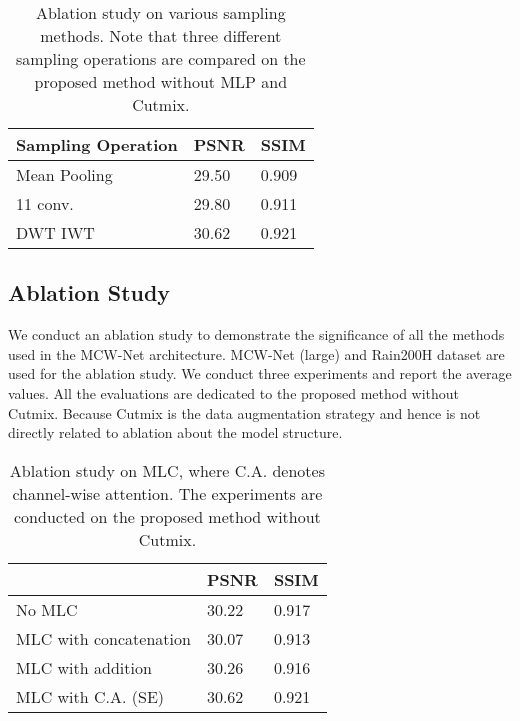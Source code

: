 \documentclass[a4paper,fleqn]{cas-dc}
\begin{document}
\begin{table}
	\caption{Ablation study on various sampling methods. Note that three different sampling operations are compared on the proposed method without MLP and Cutmix.}
	
	\begin{tabular*}{\tblwidth}{@{}LLL@{}}
		\toprule  
		Sampling Operation               & PSNR  & SSIM  \\ 
		\midrule
		Mean Pooling                     & 29.50 & 0.909 \\ 
		11 conv.                 & 29.80 & 0.911 \\
	    DWT  IWT                     & 30.62 & 0.921 \\ 
	    \bottomrule
	\end{tabular*} 
	\label{tab:sampling-ablation}
\end{table}


\subsection{Ablation Study}


We conduct an ablation study to demonstrate the significance of all the methods used in the MCW-Net architecture. MCW-Net (large) and Rain200H dataset are used for the ablation study. We conduct three experiments and report the average values. All the evaluations are dedicated to the proposed method without Cutmix. Because Cutmix is the data augmentation strategy and hence is not directly related to ablation about the model structure.

\begin{table}
	\caption{Ablation study on MLC, where C.A. denotes channel-wise attention. The experiments are conducted on the proposed method without Cutmix.}
	
	\begin{tabular*}{\tblwidth}{@{}LLL@{}}
		\toprule  
		                               & PSNR  & SSIM  \\ 
		\midrule
		No MLC                          & 30.22 & 0.917\\
		MLC with concatenation       & 30.07 & 0.913 \\
		MLC with addition            & 30.26 & 0.916 \\
		MLC with C.A. (SE)           & 30.62 & 0.921 \\
	    \bottomrule
	\end{tabular*}
	\label{tab:mlc-ablation}
\end{table}
\end{document}
